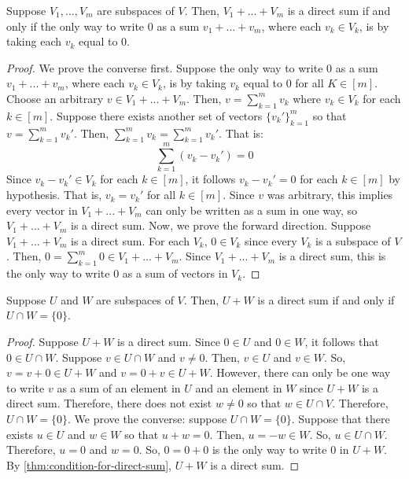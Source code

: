 \documentclass{article}
\begin{document}
\begin{theorem}
  \label{thm:condition-for-direct-sum}
  Suppose $V_1, ..., V_m$ are subspaces of $V$. Then, $V_1 + ... +
  V_m$ is a direct sum if and only if the only way to write $0$ as a
  sum $v_1 + ... + v_m$, where each $v_k \in V_k$, is by taking each
  $v_k$ equal to $0$.
\end{theorem}
\begin{proof}
  We prove the converse first. Suppose the only way to write $0$ as a
  sum $v_1 + ... + v_m$, where each $v_k \in V_k$, is by taking $v_k$
  equal to $0$ for all $K \in [m]$. Choose an arbitrary $v \in V_1 +
  ... + V_m$. Then, $v = \sum_{k=1}^m v_k$ where $v_k \in V_k$ for
  each $k \in [m]$. Suppose there exists another set of vectors
  $\{v_k'\}_{k=1}^m$ so that $v = \sum_{k=1}^m v_k'$. Then,
  $\sum_{k=1}^m v_k = \sum_{k=1}^m v_k'$. That is:
  $$\sum_{k=1}^m (v_k - v_k') = 0$$
  Since $v_k - v_k' \in V_k$ for each $k \in [m]$, it follows $v_k -
  v_k' = 0$ for each $k \in [m]$ by hypothesis. That is, $v_k = v_k'$
  for all $k \in [m]$. Since $v$ was arbitrary, this implies every
  vector in $V_1 + ... + V_m$ can only be written as a sum in one way,
  so $V_1 + ... + V_m$ is a direct sum.
  Now, we prove the forward direction. Suppose $V_1 + ... + V_m$ is a
  direct sum. For each $V_k$, $0 \in V_k$ since every $V_k$ is a
  subspace of $V$. Then, $0 = \sum_{k=1}^m 0 \in V_1 + ... +
  V_m$. Since $V_1 + ... + V_m$ is a direct sum, this is the only way
  to write $0$ as a sum of vectors in $V_k$.
\end{proof}

\begin{theorem}
  \label{thm:direct-sum-of-two-subspaces}
  Suppose $U$ and $W$ are subspaces of $V$. Then, $U + W$ is a direct
  sum if and only if $U \cap W = \{0\}$.
\end{theorem}
\begin{proof}
  Suppose $U + W$ is a direct sum. Since $0 \in U$ and $0 \in W$, it follows
  that $0 \in U \cap W$. Suppose $v \in U \cap W$ and $v \ne 0$. Then,
  $v \in U$ and $v \in W$. So, $v = v + 0 \in U + W$ and $v = 0 + v
  \in U + W$. However, there can only be one way to write $v$ as a sum
  of an element in $U$ and an element in $W$ since $U + W$ is a direct
  sum. Therefore, there does not exist $w \ne 0$ so that $w \in U \cap
  V$. Therefore, $U \cap W = \{0\}$.
  We prove the converse: suppose $U \cap W = \{0\}$. Suppose that
  there exists $u \in U$ and $w \in W$ so that $u + w = 0$. Then, $u =
  -w \in W$. So, $u \in U \cap W$. Therefore, $u = 0$ and $w =
  0$. So, $0 = 0 + 0$ is the only way to write $0$ in $U + W$. By
  \cref{thm:condition-for-direct-sum}, $U + W$ is a direct sum.
\end{proof}
\end{document}

